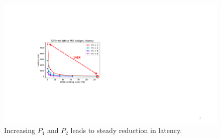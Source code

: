
\begin{figure}[t!]
\centering
\includegraphics[width = 0.78\linewidth]{./figs/design_space_latency_annotated.pdf}
\caption{Increasing $P_1$ and $P_2$ leads to steady reduction in latency.}
\label{fig:design_space_latency}
\end{figure}

